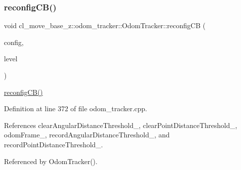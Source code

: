 \mbox{\label{classcl__move__base__z_1_1odom__tracker_1_1OdomTracker_adb06a17455b8d545034d8845706e2886}} 
\subsubsection{\texorpdfstring{reconfig\+C\+B()}{reconfigCB()}}
{\footnotesize\ttfamily void cl\+\_\+move\+\_\+base\+\_\+z\+::odom\+\_\+tracker\+::\+Odom\+Tracker\+::reconfig\+CB (\begin{DoxyParamCaption}\item[{move\+\_\+base\+\_\+z\+\_\+client\+\_\+plugin\+::\+Odom\+Tracker\+Config \&}]{config,  }\item[{uint32\+\_\+t}]{level }\end{DoxyParamCaption})\hspace{0.3cm}{\ttfamily [protected]}}

\hyperlink{classcl__move__base__z_1_1odom__tracker_1_1OdomTracker_adb06a17455b8d545034d8845706e2886}{reconfig\+C\+B()} 

Definition at line 372 of file odom\+\_\+tracker.\+cpp.



References clear\+Angular\+Distance\+Threshold\+\_\+, clear\+Point\+Distance\+Threshold\+\_\+, odom\+Frame\+\_\+, record\+Angular\+Distance\+Threshold\+\_\+, and record\+Point\+Distance\+Threshold\+\_\+.



Referenced by Odom\+Tracker().


